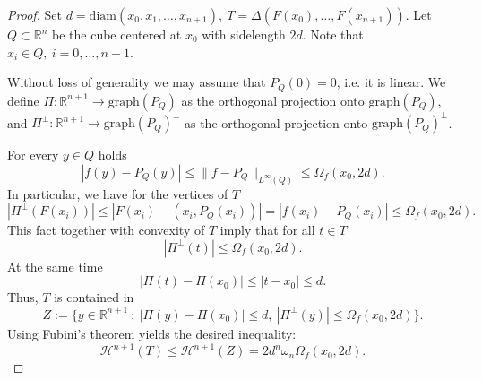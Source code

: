\documentclass[11pt]{amsart}
\newcommand{\R}{\mathbb{R}}
\renewcommand{\H}{\mathscr{H}}
\newcommand{\diam}{\mathrm{diam}}
\theoremstyle{definition}
\begin{document}
	\begin{proof}
		
		Set $d=\diam(x_0,x_1,\dots,x_{n+1}),\ T= \Delta(F(x_0),\dots,F(x_{n+1}))$.
		Let $Q\subset \R^n$ be the cube centered at $x_0$ with sidelength $2d$. Note that $x_i\in Q,\ i=0,\dots,n+1$.
		
		Without loss of generality we may assume that $P_Q(0)=0$, i.e. it is linear. We define $\Pi:\R^{n+1}\rightarrow\text{graph} (P_Q)$ as the orthogonal projection onto $\text{graph} (P_Q)$, and $\Pi^{\perp}:\R^{n+1}\rightarrow\text{graph} (P_Q)^{\perp}$ as the orthogonal projection onto $\text{graph}(P_Q)^{\perp}$.

		For every $y\in Q$ holds
		\begin{equation*}
		|f(y)-P_Q(y)|\leq \lVert f-P_Q\rVert_{L^{\infty}(Q)}\le \Omega_f(x_0,2d).
		\end{equation*}
		In particular, we have for the vertices of $T$
		\begin{equation*}
		|\Pi^{\perp}(F(x_i))|\le|F(x_i)-(x_i,P_Q(x_i))|=|f(x_i)-P_Q(x_i)|\leq \Omega_f(x_0,2d).
		\end{equation*} 
		This fact together with convexity of $T$ imply that for all $t\in T$
		\begin{equation*}\label{eq:ineq_on_T}
		|\Pi^{\perp}(t)|\leq \Omega_f(x_0,2d).
		\end{equation*}
		At the same time
		\begin{equation*}
		|\Pi(t)-\Pi(x_0)|\leq|t-x_0|\leq d.
		\end{equation*}
		Thus, $T$ is contained in
		\begin{equation*}
		Z := \{y\in\R^{n+1}\ :\ |\Pi(y)-\Pi(x_0)|\leq d,\ |\Pi^{\perp}(y)|\leq \Omega_f(x_0,2d)\}.
		\end{equation*}
		Using Fubini's theorem yields the desired inequality:
		\begin{equation*}\label{eq:tplussinequality}
		\H^{n+1}(T)\leq \H^{n+1}(Z)=2d^n\omega_n\Omega_f(x_0,2d).
		\end{equation*}
	\end{proof}
	
\end{document}
